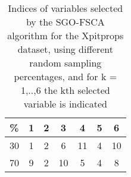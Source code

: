 \begin{table}
	\begin{center}
		\begin{tabular}{c c c c c c c}
			\% & 1 & 2 & 3 & 4 & 5 & 6 \\
			\hline
			30 & 1 & 2 & 6 & 11 & 4 & 10 \\
			70 & 9 & 2 & 10 & 5 & 4 & 8 \\
		\end{tabular}
	\end{center}
	\caption{Indices of variables selected by the SGO-FSCA algorithm for the Xpitprops dataset, using different random sampling percentages, and for k = 1,..,6 the kth selected variable is indicated}
\end{table}